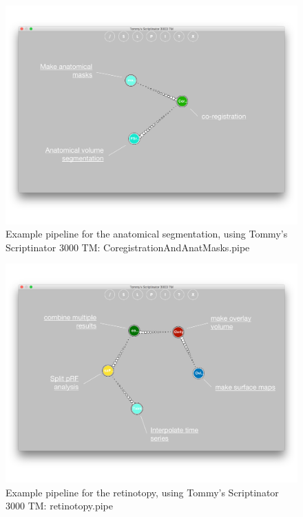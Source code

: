 \documentclass[12pt,a4paper]{scrartcl}
\begin{document}
\begin{figure}[h]
\begin{center}
\includegraphics[width=\textwidth]{segment-pipe}
\caption[Segmentation Pipeline]{Example pipeline for the anatomical segmentation, using Tommy's Scriptinator 3000 TM: CoregistrationAndAnatMasks.pipe}
\end{center}
\end{figure}

\begin{figure}[h]
\begin{center}
\includegraphics[width=\textwidth]{retino-pipe}
\caption[Retinotopy Pipeline]{Example pipeline for the retinotopy, using Tommy's Scriptinator 3000 TM: retinotopy.pipe}
\end{center}
\end{figure}
\end{document}
